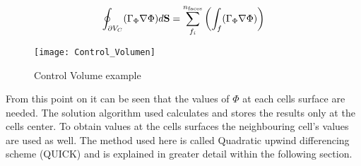 \documentclass[../thesis.tex]{subfiles}
\begin{document}
\begin{equation}
	\label{eqn:diffu_sint}
	\oint_{\partial V_C} (\Gamma_\Phi \nabla \Phi) d\bold{S} =  \sum_{f_i}^{n_{\text{faces}}}\left( \int_{f} (\Gamma_\Phi \nabla \Phi) \right)
\end{equation} 

\begin{figure}[htbp]
	\centering
	\texttt{[image: Control\_Volumen]}
	\caption{Control Volume example}
	\label{fig:FVM_CV}
\end{figure}

From this point on it can be seen that the values of $\Phi$ at each cells surface are needed. The solution algorithm used calculates and stores the results only at the cells center. To obtain values at the cells surfaces the neighbouring cell's values are used as well. The method used here is called Quadratic upwind differencing scheme (QUICK) and is explained in greater detail within the following section.
\end{document}
